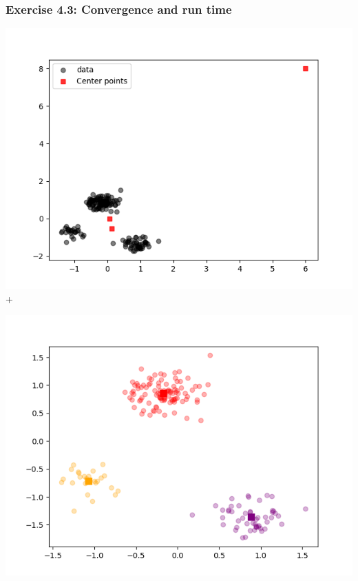 \documentclass[10pt,aspectratio=169,handout]{beamer}
\begin{document}
\begin{frame}
    \frametitle{Exercise 4.3: Convergence and run time}

    \begin{minipage}{0.49\textwidth}
        \includegraphics[width=\textwidth]{images/kmeans-n.png}+
    \end{minipage}
    \begin{minipage}{0.49\textwidth}
        \includegraphics[width=\textwidth]{images/blob_mean4.4.png}
    \end{minipage}
    
\end{frame}
\end{document}
